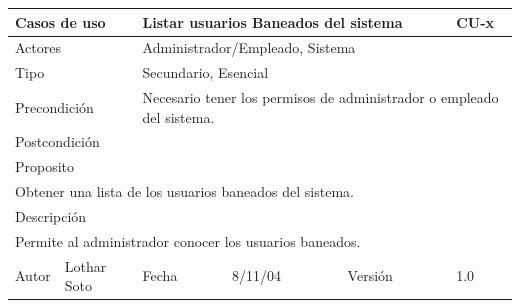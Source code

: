 \documentclass{article}
\begin{document}
\begin{table}[h]
\begin{tabular}{|l|l|l|l|l|l|}
\hline
\multicolumn{2}{|p{2cm}|}{Casos de uso}  & \multicolumn{3}{p{7cm}|}{Listar usuarios Baneados del sistema} & CU-x \\
\hline
\multicolumn{2}{|p{2cm}|}{Actores}       & \multicolumn{4}{p{8cm}|}{Administrador/Empleado, Sistema}        \\
\hline
\multicolumn{2}{|p{2cm}|}{Tipo}          & \multicolumn{4}{p{8cm}|}{Secundario, Esencial}        \\
\hline
\multicolumn{2}{|p{2cm}|}{Precondición}  & \multicolumn{4}{p{8cm}|}{Necesario tener los permisos de administrador o empleado del sistema.}        \\
\hline
\multicolumn{2}{|p{2cm}|}{Postcondición} & \multicolumn{4}{p{8cm}|}{}        \\
\hline
\multicolumn{6}{|p{10cm}|}{Proposito}                                   \\
\hline
\multicolumn{6}{|p{10cm}|}{Obtener una lista de los usuarios baneados del sistema.}                                            \\
\hline
\multicolumn{6}{|p{10cm}|}{Descripción}                                 \\
\hline
\multicolumn{6}{|p{10cm}|}{Permite al administrador conocer los usuarios baneados.}                                            \\
\hline
Autor          &       Lothar Soto        & Fecha    &  8/11/04   &   Versión  & 1.0\\    
\hline
\end{tabular}
\end{table}
\end{document}
